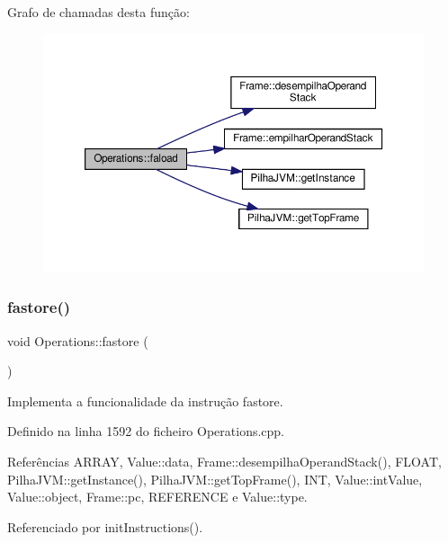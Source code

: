 Grafo de chamadas desta função\+:
\nopagebreak
\begin{figure}[H]
\begin{center}
\leavevmode
\includegraphics[width=350pt]{classOperations_ac22c02d88fa894cafd3f53c54d91409d_cgraph}
\end{center}
\end{figure}
\mbox{\label{classOperations_aa8a2c3048379b9d5cdc2b4611ef86190}} 
\subsubsection{\texorpdfstring{fastore()}{fastore()}}
{\footnotesize\ttfamily void Operations\+::fastore (\begin{DoxyParamCaption}{ }\end{DoxyParamCaption})\hspace{0.3cm}{\ttfamily [private]}}



Implementa a funcionalidade da instrução fastore. 



Definido na linha 1592 do ficheiro Operations.\+cpp.



Referências A\+R\+R\+AY, Value\+::data, Frame\+::desempilha\+Operand\+Stack(), F\+L\+O\+AT, Pilha\+J\+V\+M\+::get\+Instance(), Pilha\+J\+V\+M\+::get\+Top\+Frame(), I\+NT, Value\+::int\+Value, Value\+::object, Frame\+::pc, R\+E\+F\+E\+R\+E\+N\+CE e Value\+::type.



Referenciado por init\+Instructions().

